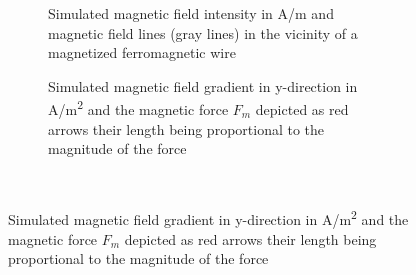 \begin{figure}[H]
            \begin{subfigure}{0.49\textwidth}
                  \flushleft
                  \caption{Simulated magnetic field intensity in A/m and magnetic field lines (gray lines) in the vicinity of a magnetized ferromagnetic wire}\label{fig:sw_mag_field}
          \end{subfigure}\hfill
        \begin{subfigure}{0.49\textwidth}
                \flushright
                \caption{Simulated magnetic field gradient in y-direction in A/m\textsuperscript{2} and the magnetic force $F_{m}$ depicted as red arrows their length being proportional to the magnitude of the force}\label{fig:mag_force_sw}
        \end{subfigure}
        \\
        

\end{figure}
